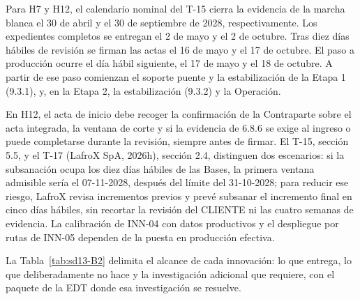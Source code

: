 \begin{samepage}
Para H7 y H12, el calendario nominal del T-15 cierra la evidencia de la marcha blanca el 30 de abril y el 30 de septiembre de 2028, respectivamente. Los expedientes completos se entregan el 2 de mayo y el 2 de octubre. Tras diez días hábiles de revisión se firman las actas el 16 de mayo y el 17 de octubre. El paso a producción ocurre el día hábil siguiente, el 17 de mayo y el 18 de octubre. A partir de ese paso comienzan el soporte puente y la estabilización de la Etapa 1 (9.3.1), y, en la Etapa 2, la estabilización (9.3.2) y la Operación.\par
\end{samepage}

En H12, el acta de inicio debe recoger la confirmación de la Contraparte sobre el acta integrada, la ventana de corte y si la evidencia de 6.8.6 se exige al ingreso o puede completarse durante la revisión, siempre antes de firmar. El T-15, sección 5.5, y el T-17 (LafroX SpA, 2026h), sección 2.4, distinguen dos escenarios: si la subsanación ocupa los diez días hábiles de las Bases, la primera ventana admisible sería el 07-11-2028, después del límite del 31-10-2028; para reducir ese riesgo, LafroX revisa incrementos previos y prevé subsanar el incremento final en cinco días hábiles, sin recortar la revisión del CLIENTE ni las cuatro semanas de evidencia. La calibración de INN-04 con datos productivos y el despliegue por rutas de INN-05 dependen de la puesta en producción efectiva.

La Tabla~\ref{tab:sd13-B2} delimita el alcance de cada innovación: lo que entrega, lo que deliberadamente no hace y la investigación adicional que requiere, con el paquete de la EDT donde esa investigación se resuelve.

